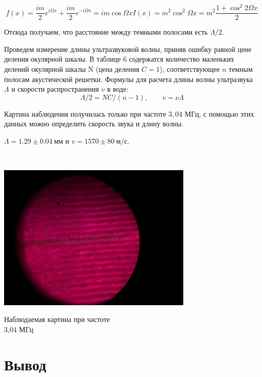 \documentclass[a4paper,12pt]{article}
\begin{document}
\begin{equation}\label{}
f(x) = \dfrac{im}{2} e^{i\Omega x} +  \dfrac{im}{2} e^{-i\Omega x} = im \cos \Omega x  I(x) = m^2 \cos ^2 \Omega x = m^2 \dfrac{1 + \cos ^2 2 \Omega x}{2}
\end{equation}

Отсюда получаем, что расстояние между темными полосами есть $ \Lambda/2 $.


Проведем измерение длины ультразвуковой волны, приняв ошибку равной цене деления окулярной шкалы. В таблице 6 содержатся количество маленьких делений окулярной шкалы N (цена деления $ C = 1 $), соответствующее $ n $ темным полосам акустической решетки.
Формулы для расчета длины волны ультразвука $ \Lambda $ и скорости распространения $ v $ в воде:
\begin{equation}\label{}
\Lambda/2  = NC/(n - 1),  \qquad v = \nu\Lambda
\end{equation}

Картина наблюдения получилась только при частоте $3,04 \text{ МГц}$, с помощью этих данных можно определить скорость звука и длину волны. 

 $\Lambda = 1.29\pm0.04 \ \text{мм}$ и $v = 1570 \pm 80\ \text{м/с}$. 

\



\begin{center}
	\includegraphics[width=0.7\textwidth]{pic4.jpg}
	
	Наблюдаемая картина при частоте\\ 3,04 МГц
\end{center}



\section{Вывод}
\end{document}

